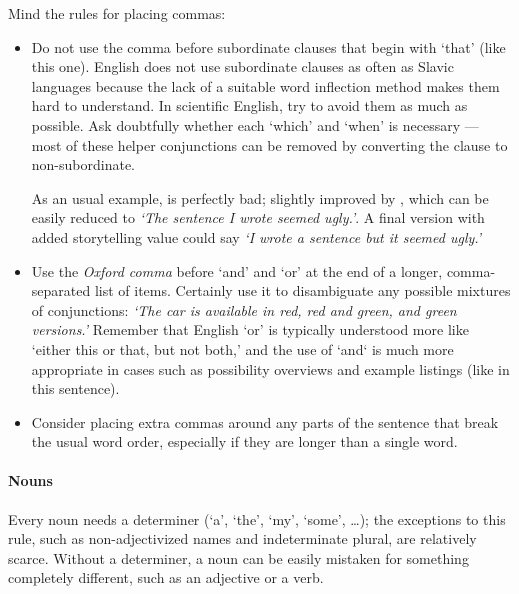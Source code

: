 Mind the rules for placing commas:
\begin{itemize}
\item Do not use the comma before subordinate clauses that begin with `that' (like this one). English does not use subordinate clauses as often as Slavic languages because the lack of a suitable word inflection method makes them hard to understand. In scientific English, try to avoid them as much as possible. Ask doubtfully whether each `which' and `when' is necessary --- most of these helper conjunctions can be removed by converting the clause to non-subordinate.

As an usual example,  is perfectly bad; slightly improved by , which can be easily reduced to \textit{`The sentence I wrote seemed ugly.'}. A final version with added storytelling value could say \textit{`I wrote a sentence but it seemed ugly.'}
\item Use the \emph{Oxford comma} before `and' and `or' at the end of a longer, comma-separated list of items. Certainly use it to disambiguate any possible mixtures of conjunctions: \textit{`The car is available in red, red and green, and green versions.'} Remember that English `or' is typically understood more like `either this or that, but not both,' and the use of `and` is much more appropriate in cases such as possibility overviews and example listings (like in this sentence).
\item Consider placing extra commas around any parts of the sentence that break the usual word order, especially if they are longer than a single word.
\end{itemize}

\paragraph{Nouns}
Every noun needs a determiner (`a', `the', `my', `some', \dots); the exceptions to this rule, such as non-adjectivized names and indeterminate plural, are relatively scarce. Without a determiner, a noun can be easily mistaken for something completely different, such as an adjective or a verb.

